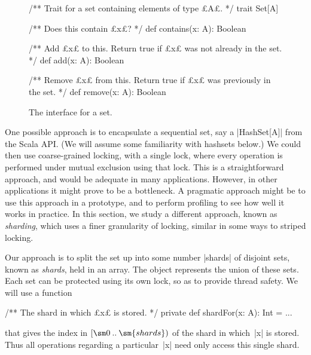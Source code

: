 
\begin{figure}
\begin{scala}
/** Trait for a set containing elements of type £A£. */
trait Set[A]{
  /** Does this contain £x£? */
  def contains(x: A): Boolean

  /** Add £x£ to this.  Return true if £x£ was not already in the set. */
  def add(x: A): Boolean 

  /** Remove £x£ from this.  Return true if £x£ was previously in the set. */
  def remove(x: A): Boolean
}
\end{scala}
\caption{The interface for a set.}
\label{fig:Set-trait}
\end{figure}


One possible approach is to encapsulate a sequential set, say a |HashSet[A]|
from the Scala API{}.  (We will assume some familiarity with hashsets below.)
We could then use coarse-grained locking, with a single lock, where every
operation is performed under mutual exclusion using that lock.  This is a
straightforward approach, and would be adequate in many applications.
However, in other applications it might prove to be a bottleneck.  A pragmatic
approach might be to use this approach in a prototype, and to perform
profiling to see how well it works in practice.  In this section, we study a
different approach, known as \emph{sharding}, which uses a
finer granularity of locking, similar in some ways to striped locking.

Our approach is to split the set up into some number |shards| of disjoint
sets, known as \emph{shards}, held in an array.  The object
represents the union of these sets.  Each set can be protected using its own
lock, so as to provide thread safety.  We will use a function
%
\begin{scala}
  /** The shard in which £x£ is stored. */ 
  private def shardFor(x: A): Int = ...
\end{scala}
%
that gives the index in $\interval{\sm 0}{\sm{shards}}$ of the shard in
which~|x| is stored.  Thus all operations regarding a particular~|x| need only
access this single shard.  


